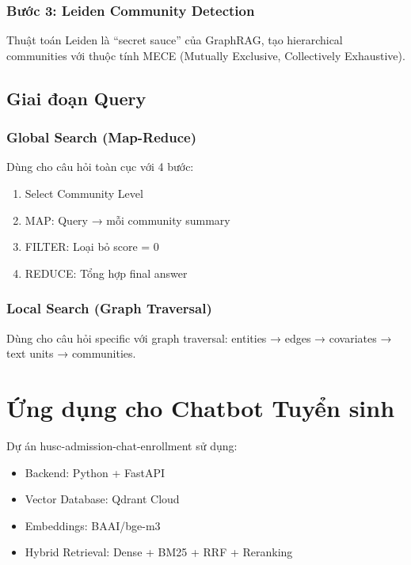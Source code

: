 \documentclass[conference]{IEEEtran}
\begin{document}
\subsubsection{Bước 3: Leiden Community Detection}

Thuật toán Leiden \cite{traag2019leiden} là ``secret sauce'' của GraphRAG, tạo hierarchical communities với thuộc tính MECE (Mutually Exclusive, Collectively Exhaustive).

\subsection{Giai đoạn Query}

\subsubsection{Global Search (Map-Reduce)}

Dùng cho câu hỏi toàn cục với 4 bước:
\begin{enumerate}
    \item Select Community Level
    \item MAP: Query → mỗi community summary
    \item FILTER: Loại bỏ score = 0
    \item REDUCE: Tổng hợp final answer
\end{enumerate}

\subsubsection{Local Search (Graph Traversal)}

Dùng cho câu hỏi specific với graph traversal: entities → edges → covariates → text units → communities.

\section{Ứng dụng cho Chatbot Tuyển sinh}

Dự án husc-admission-chat-enrollment sử dụng:
\begin{itemize}
    \item Backend: Python + FastAPI
    \item Vector Database: Qdrant Cloud
    \item Embeddings: BAAI/bge-m3
    \item Hybrid Retrieval: Dense + BM25 + RRF + Reranking
\end{itemize}
\end{document}
